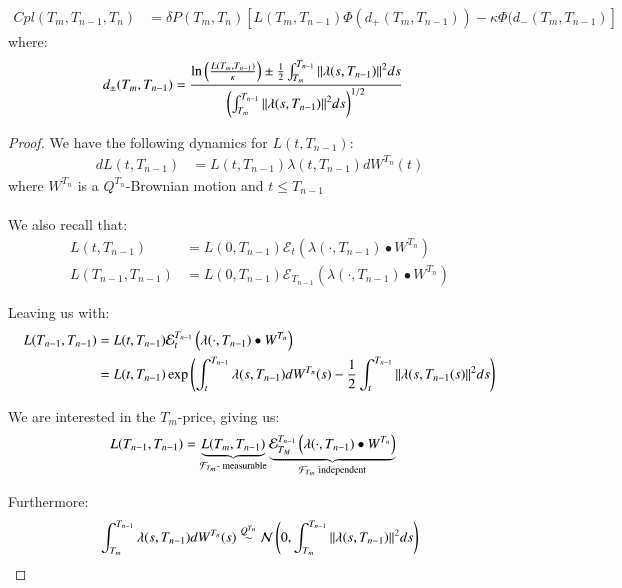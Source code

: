 \begin{proposition}
\begin{align*}
Cpl(T_{m}, T_{n-1}, T_{n})
&= 
\delta P(T_{m}, T_{n})\left[
L(T_{m}, T_{n-1})\Phi(d_{+}(T_{m}, T_{n-1}))
-\kappa \Phi(d_{-}(T_{m}, T_{n-1})
\right]
\end{align*}
where: 
\begin{align*}
d_{\pm}(T_{m}, T_{n-1}) &= 
\frac{
\ln\left( 
\frac{L(T_{m}, T_{n-1})}{\kappa}
\right) \pm 
\frac{1}{2}\int_{T_{m}}^{T_{n-1}}\norm{\lambda(s,T_{n-1})}^{2}ds
}{
\left(
\int_{T_{m}}^{T_{n-1}}\norm{\lambda(s,T_{n-1})}^{2}ds
\right)^{1/2}
}
\end{align*}
\end{proposition}

\begin{proof}
We have the following dynamics for $L(t,T_{n-1})$: 
\begin{align*}
dL(t,T_{n-1}) &= L(t,T_{n-1})\lambda(t,T_{n-1})dW^{T_{n}}(t) 
\end{align*}
where $W^{T_{n}}$ is a $Q^{T_{n}}$-Brownian motion and $t\leq T_{n-1}$
\\~\\ 
We also recall that: 
\begin{align*}
L(t,T_{n-1}) &= L(0,T_{n-1})\mathcal{E}_{t}\left(
\lambda(\cdot, T_{n-1})\bullet W^{T_{n}}
\right) \\ 
L(T_{n-1}, T_{n-1}) &= L(0,T_{n-1})\mathcal{E}_{T_{n-1}}\left(
\lambda(\cdot, T_{n-1})\bullet W^{T_{n}}
\right)
\end{align*}

Leaving us with: 
\begin{align*}
L(T_{n-1}, T_{n-1}) &= L(t,T_{n-1})\mathcal{E}_{t}^{T_{n-1}}\left(
\lambda(\cdot, T_{n-1})\bullet W^{T_{n}}
\right) \\ 
&= L(t,T_{n-1})\exp\left(
\int_{t}^{T_{n-1}}\lambda(s, T_{n-1})dW^{T_{n}}(s)
-\frac{1}{2}\int_{t}^{T_{n-1}}\norm{\lambda(s, T_{n-1}(s)}^{2}ds
\right)
\end{align*} 

We are interested in the $T_{m}$-price, giving us: 
\begin{align*}
L(T_{n-1}, T_{n-1}) &= \underbrace{L(T_{m}, T_{n-1})}_{\text{$\mathcal{F}_{T_{m}}$- measurable}}
\underbrace{\mathcal{E}_{T_{M}}^{T_{n-1}}\left(
\lambda(\cdot, T_{n-1})\bullet W^{T_{n}}
\right)}_{\text{$\mathcal{F}_{T_{m}}$ independent}}    
\end{align*}

Furthermore:
\begin{align*}
\int_{T_{m}}^{T_{n-1}}\lambda(s, T_{n-1})dW^{T_{n}}(s)
\stackrel{Q^{T_{n}}}{\sim} \mathcal{N}\left(
0, \int_{T_{m}}^{T_{n-1}}\norm{\lambda(s,T_{n-1})}^{2}ds
\right)
\end{align*}


\end{proof}
